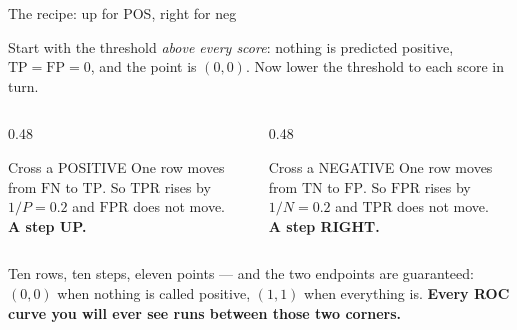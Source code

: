\documentclass[aspectratio=169]{beamer}
\newcommand{\TP}{\mathrm{TP}}
\newcommand{\FP}{\mathrm{FP}}
\newcommand{\TN}{\mathrm{TN}}
\newcommand{\FN}{\mathrm{FN}}
\newcommand{\TPR}{\mathrm{TPR}}
\newcommand{\FPR}{\mathrm{FPR}}
\begin{document}
\begin{frame}[shrink=6]{The recipe: up for POS, right for neg}
  \begin{exampleblock}{}
    \centering\small
    Start with the threshold \emph{above every score}: nothing is predicted
    positive, $\TP = \FP = 0$, and the point is $(0, 0)$. Now lower the
    threshold to each score in turn.
  \end{exampleblock}
  \vspace{0.2em}
  \begin{columns}[T]
    \begin{column}{0.48\textwidth}
      \begin{block}{Cross a POSITIVE}
        \small One row moves from $\FN$ to $\TP$. So $\TPR$ rises by
        $1/P = 0.2$ and $\FPR$ does not move.\\[0.3em]
        \centering\textbf{A step UP.}
      \end{block}
    \end{column}
    \begin{column}{0.48\textwidth}
      \begin{block}{Cross a NEGATIVE}
        \small One row moves from $\TN$ to $\FP$. So $\FPR$ rises by
        $1/N = 0.2$ and $\TPR$ does not move.\\[0.3em]
        \centering\textbf{A step RIGHT.}
      \end{block}
    \end{column}
  \end{columns}
  \vspace{0.3em}
  \begin{alertblock}{}
    \centering\small
    Ten rows, ten steps, eleven points --- and the two endpoints are
    guaranteed: $(0,0)$ when nothing is called positive, $(1,1)$ when
    everything is. \textbf{Every ROC curve you will ever see runs between
    those two corners.}
  \end{alertblock}
\end{frame}
\end{document}
